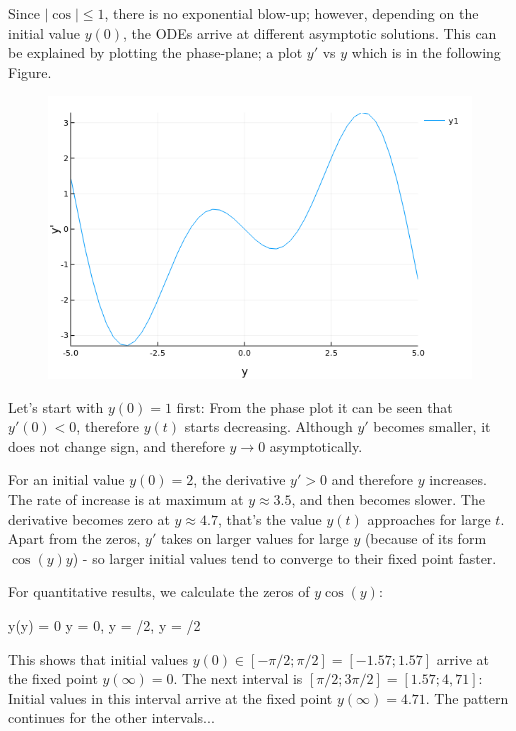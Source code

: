 Since $|\cos| \leq 1$, there is no exponential blow-up; however, depending on the initial value $y(0)$, the ODEs arrive at different asymptotic solutions. This can be explained by plotting the phase-plane; a plot $y'$ vs $y$ which is in the following Figure.

\begin{figure}[H]
	\includegraphics[scale=0.5]{images/ode_01_04.png}
\end{figure}

Let's start with $y(0) = 1$ first: From the phase plot it can be seen that $y'(0) < 0$, therefore $y(t)$ starts decreasing. Although $y'$ becomes smaller, it does not change sign, and therefore $y \rightarrow 0$ asymptotically.

For an initial value $y(0) = 2$, the derivative $y'>0$ and therefore $y$ increases. The rate of increase is at maximum at $y \approx 3.5$, and then becomes slower. The derivative becomes zero at $y \approx 4.7$, that's the value $y(t)$ approaches for large $t$. Apart from the zeros, $y'$ takes on larger values for large $y$ (because of its form $\cos(y) y$) - so larger initial values tend to converge to their fixed point faster.

For quantitative results, we calculate the zeros of $y\cos(y)$:

\bee
y\cos(y) = 0 \rightarrow y = 0, y = \pm \pi/2, y = \pi/2
\eee

This shows that initial values $y(0) \in [-\pi/2; \pi/2] = [-1.57; 1.57]$ arrive at the fixed point $y(\infty)=0$. The next interval is $[\pi/2; 3\pi/2] = [1.57;4,71]$: Initial values in this interval arrive at the fixed point $y(\infty)=4.71$. The pattern continues for the other intervals...


